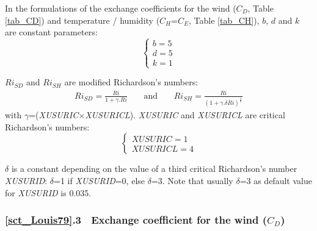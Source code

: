 In the formulations of the exchange coefficients for the wind ($C_D$, Table \ref{tab_CD}) and temperature / humidity ($C_H$=$C_E$, Table \ref{tab_CH}),
$b$, $d$ and $k$ are constant parameters:
\begin{equation}
\left\{
\begin{array}{l}
	b=5\\
	d=5\\
	k=1
\end{array}
\right.
\end{equation}

$Ri_{\mathit{SD}}$ and $Ri_{\mathit{SH}}$ are modified Richardson's numbers:
\begin{equation}
\begin{array}{lll}
	Ri_{\mathit{SD}}=\frac{Ri}{1+\gamma.Ri} & ~~~~~\mathrm{and}~~~~~ & Ri_{\mathit{SH}}=\frac{Ri}{(1+\gamma.\delta Ri)^{\frac{1}{\delta}}}
\end{array}
\end{equation}
with $\gamma$=(\textit{XUSURIC}$\times$\textit{XUSURICL}). \textit{XUSURIC} and \textit{XUSURICL} are critical Richardson's numbers:
\begin{equation}
\left\{
\begin{array}{l}
	\mathit{XUSURIC}=1\\
	\mathit{XUSURICL}=4
\end{array}
\right.
\end{equation}

$\delta$ is a constant depending on the value of a third critical Richardson's number \textit{XUSURID}:
$\delta$=1 if \textit{XUSURID}=0, else $\delta$=3.
Note that usually $\delta$=3 as default value for \textit{XUSURID} is 0.035.\\

\subsubsection{\ref{sct_Louis79}.3 $~$ Exchange coefficient for the wind (\boldmath$C_D$)}

